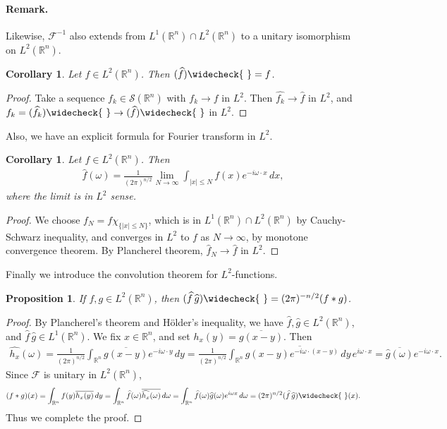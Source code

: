 \documentclass{article}
\numberwithin{equation}{section}
\newcommand{\bbR}{\mathbb{R}}
\renewcommand{\cal}{\mathcal}
\newcommand{\ol}{\overline}
\newcommand{\wh}{\widehat}
\theoremstyle{plain}
\newtheorem{proposition}[theorem]{Proposition}
\newtheorem{corollary}[theorem]{Corollary}
\theoremstyle{definition}
\begin{document}
\paragraph{Remark.} Likewise, $\cal{F}^{-1}$ also extends from $L^1(\bbR^n)\cap L^2(\bbR^n)$ to a unitary isomorphism on $L^2(\bbR^n)$.

\begin{corollary}
Let $f\in L^2(\bbR^n)$. Then $(\wh{f})\widecheck{\ }=f$.
\end{corollary}
\begin{proof}
Take a sequence $f_k\in\cal{S}(\bbR^n)$ with $f_k\to f$ in $L^2$. Then $\wh{f_k}\to\wh{f}$ in $L^2$, and $f_k=(\wh{f_k})\widecheck{\ }\to(\wh{f})\widecheck{\ }$ in $L^2$.
\end{proof}

Also, we have an explicit formula for Fourier transform in $L^2$.
\begin{corollary}
Let $f\in L^2(\bbR^n)$. Then
\begin{align*}
	\wh{f}(\omega)=\frac{1}{(2\pi)^{n/2}}\lim_{N\to\infty}\int_{\vert x\vert\leq N}f(x)e^{-i\omega\cdot x}\,dx,
\end{align*}
where the limit is in $L^2$ sense.
\end{corollary}
\begin{proof}
We choose $f_N=f\chi_{\{\vert x\vert\leq N\}}$, which is in $L^1(\bbR^n)\cap L^2(\bbR^n)$ by Cauchy-Schwarz inequality, and converges in $L^2$ to $f$ as $N\to\infty$, by monotone convergence theorem. By Plancherel theorem, $\wh{f}_N\to\wh{f}$ in $L^2$.
\end{proof}
Finally we introduce the convolution theorem for $L^2$-functions.
\begin{proposition}
If $f,g\in L^2(\bbR^n)$, then $(\wh{f}\,\wh{g})\widecheck{\ }=(2\pi)^{-n/2}(f*g)$.
\end{proposition}
\begin{proof}
By Plancherel's theorem and Hölder's inequality, we have $\wh{f},\wh{g}\in L^2(\bbR^n)$, and $\wh{f}\,\wh{g}\in L^1(\bbR^n)$. We fix $x\in\bbR^n$, and set $h_x(y)=\ol{g(x-y)}$. Then
\begin{align*}
	\wh{h_x}(\omega)=\frac{1}{(2\pi)^{n/2}}\int_{\bbR^n}\ol{g(x-y)}e^{-i\omega\cdot y}\,dy=\frac{1}{(2\pi)^{n/2}}\ol{\int_{\bbR^n}g(x-y)e^{-i\omega\cdot(x-y)}\,dy\,e^{i\omega\cdot x}}=\ol{\wh{g}(\omega)}e^{-i\omega\cdot x}.
\end{align*}
Since $\cal{F}$ is unitary in $L^2(\bbR^n)$,
\begin{align*}
	(f*g)(x)=\int_{\bbR^n}f(y)\ol{h_x(y)}\,dy=\int_{\bbR^n}\wh{f}(\omega)\ol{\wh{h_x}(\omega)}\,d\omega=\int_{\bbR^n}\wh{f}(\omega)\wh{g}(\omega)e^{i\omega x}\,d\omega=(2\pi)^{n/2}(\wh{f}\,\wh{g})\widecheck{\ }(x).
\end{align*}
Thus we complete the proof.
\end{proof}
\end{document}
